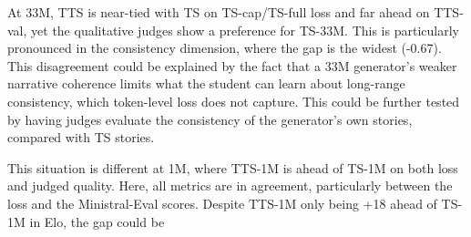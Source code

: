 \documentclass{article}
\begin{document}
At 33M, TTS is near-tied with TS on TS-cap/TS-full loss and far ahead on TTS-val, yet the qualitative judges show a preference for TS-33M. This is particularly pronounced in the consistency dimension, where the gap is the widest (-0.67). This disagreement could be explained by the fact that a 33M generator's weaker narrative coherence limits what the student can learn about long-range consistency, which token-level loss does not capture. This could be further tested by having judges evaluate the consistency of the generator's own stories, compared with TS stories.

This situation is different at 1M, where TTS-1M is ahead of TS-1M on both loss and judged quality. Here, all metrics are in agreement, particularly between the loss and the Ministral-Eval scores. Despite TTS-1M only being +18 ahead of TS-1M in Elo, the gap could be
\end{document}
